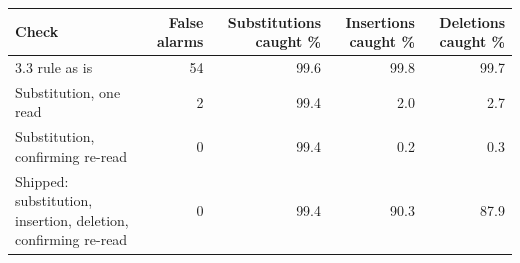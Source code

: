 \begin{tabular}{@{}lrrrr@{}}
\toprule
Check & False alarms & Substitutions caught \% & Insertions caught \% & Deletions caught \% \\
\midrule
3.3 rule as is & 54 & 99.6 & 99.8 & 99.7 \\
Substitution, one read & 2 & 99.4 & 2.0 & 2.7 \\
Substitution, confirming re-read & 0 & 99.4 & 0.2 & 0.3 \\
Shipped: substitution, insertion, deletion, confirming re-read & 0 & 99.4 & 90.3 & 87.9 \\
\bottomrule
\end{tabular}
